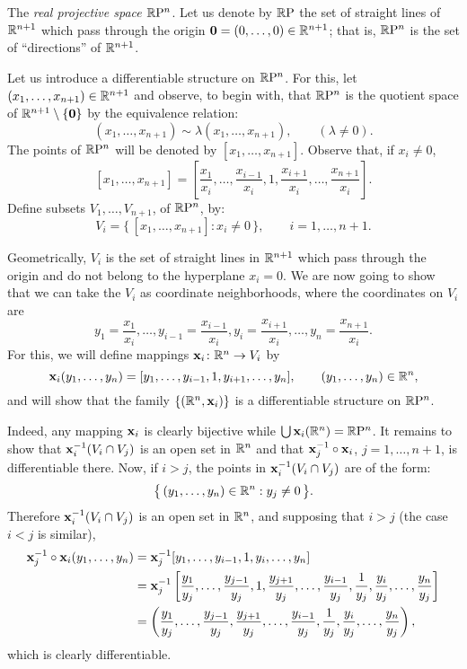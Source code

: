 \begin{example}
  The \emph{real projective space \(\mathbb{R}\mathrm{P}^n\)}. Let us denote by
  \(\mathbb{R}\mathrm{P}\) the set of straight lines of \(\mathbb{R}^{n+1}\) which pass
  through the origin \(\mathbf{0}=(0,\dotsc,0)\in\mathbb{R}^{n+1}\); that is,
  \(\mathbb{R}\mathrm{P}^n\) is the set of ``directions'' of \(\mathbb{R}^{n+1}\).

  Let us introduce a differentiable structure on \(\mathbb{R}\mathrm{P}^n\). For this,
  let \((x_1,\dotsc,x_{n+1})\in\mathbb{R}^{n+1}\) and observe, to begin with,
  that \(\mathbb{R}\mathrm{P}^n\) is the quotient space of
  \(\mathbb{R}^{n+1}\setminus\{\mathbf{0}\}\) by the equivalence relation:
  \[
    (x_1,\dotsc,x_{n+1})\sim\lambda(x_1,\dotsc,x_{n+1}), \qquad
    (\lambda\neq 0).
  \]
  The points of \(\mathbb{R}\mathrm{P}^n\) will be denoted by
  \([x_1,\dotsc,x_{n+1}]\). Observe that, if \(x_i\neq 0\),
  \[
    [x_1,\dotsc,x_{n+1}]=
    \left[\frac{x_1}{x_i},\dotsc,\frac{x_{i-1}}{x_i},1,\frac{x_{i+1}}{x_i},\dotsc,\frac{x_{n+1}}{x_i}\right].
  \]
  Define subsets \(V_1,\dotsc,V_{n+1}\), of \(\mathbb{R}\mathrm{P}^n\), by:
  \[
    V_i=\bigl\{\,[x_1,\dotsc,x_{n+1}]:x_i\neq 0\,\bigr\},\qquad i=1,\dotsc,n+1.
  \]

  Geometrically, \(V_i\) is the set of straight lines in \(\mathbb{R}^{n+1}\)
  which pass through the origin and do not belong to the hyperplane
  \(x_i=0\). We are now going to show that we can take the \(V_i\) as
  coordinate neighborhoods, where the coordinates on \(V_i\) are
  \[
    y_1=\frac{x_1}{x_i},\dotsc,y_{i-1}=\frac{x_{i-1}}{x_i},
    y_i=\frac{x_{i+1}}{x_i},\dotsc,y_n=\frac{x_{n+1}}{x_i}.
  \]
  For this, we will define mappings \(\mathbf{x}_i\colon\mathbb{R}^n\to V_i\) by
  \[
    \mathbf{x}_i(y_1,\dotsc,y_n)=[y_1,\dotsc,y_{i-1},1,y_{i+1},\dotsc,y_n]
    ,\qquad (y_1,\dotsc,y_n)\in\mathbb{R}^n,
  \]
  and will show that the family \(\{(\mathbb{R}^n,\mathbf{x}_i)\}\) is a differentiable
  structure on \(\mathbb{R}\mathrm{P}^n\).

  Indeed, any mapping \(\mathbf{x}_i\) is clearly bijective while
  \(\bigcup\mathbf{x}_i(\mathbb{R}^n)=\mathbb{R}\mathrm{P}^n\). It remains to show that
  \(\mathbf{x}_i^{-1}(V_i\cap V_j)\) is an open set in \(\mathbb{R}^n\) and that
  \(\mathbf{x}_j^{-1}\circ\mathbf{x}_i\), \(j=1,\dotsc,n+1\), is differentiable
  there. Now, if \(i>j\), the points in \(\mathbf{x}_i^{-1}(V_i\cap V_j)\) are of
  the form:
  \[
    \bigl\{\,(y_1,\dotsc,y_n)\in\mathbb{R}^n:y_j\neq 0\,\bigr\}.
  \]
  Therefore \(\mathbf{x}_i^{-1}(V_i\cap V_j)\) is an open set in \(\mathbb{R}^n\), and
  supposing that \(i>j\) (the case \(i<j\) is similar),
  \begin{align*}
    \mathbf{x}_j^{-1}\circ\mathbf{x}_i(y_1,\dotsc,y_n)
    &=\mathbf{x}_j^{-1}[y_1,\dotsc,y_{i-1},1,y_i,\dotsc,y_n]\\
    &=\mathbf{x}_j^{-1}\left[\frac{y_1}{y_j},\dotsc,\frac{y_{j-1}}{y_j},1,
      \frac{y_{j+1}}{y_j},\dotsc,\frac{y_{i-1}}{y_j},\frac{1}{y_j},
      \frac{y_i}{y_j},\dotsc,\frac{y_n}{y_j}\right]\\
    &=\left(\frac{y_1}{y_j},\dotsc,\frac{y_{j-1}}{y_j},\frac{y_{j+1}}{y_j},
      \dotsc,\frac{y_{i-1}}{y_j},\frac{1}{y_j},\frac{y_i}{y_j},\dotsc,
      \frac{y_n}{y_j}\right),
  \end{align*}
  which is clearly differentiable.


\end{example}
